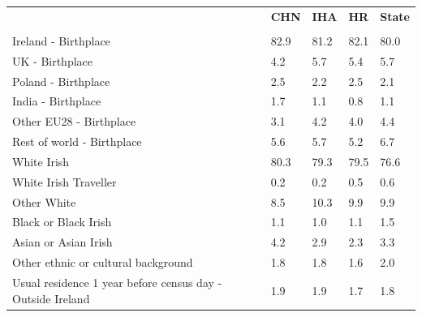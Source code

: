 \documentclass{article}
\begin{document}
\pagebreak
\begin{table}[h]	
\centering
		\begin{tabular}{KTTTT}
  \hline
& \textbf{CHN} & \textbf{IHA} & \textbf{HR}& \textbf{State}\\ 
  \hline
    \\ 
    \hline
Ireland - Birthplace & 82.9& 81.2& 82.1& 80.0\\
UK - Birthplace & 4.2& 5.7& 5.4& 5.7\\
Poland - Birthplace & 2.5& 2.2& 2.5& 2.1\\
India - Birthplace & 1.7& 1.1& 0.8& 1.1\\
Other EU28 - Birthplace & 3.1& 4.2& 4.0& 4.4\\
Rest of world - Birthplace & 5.6& 5.7& 5.2& 6.7\\
    \hline
White Irish & 80.3& 79.3& 79.5& 76.6\\
White Irish Traveller & 0.2& 0.2& 0.5& 0.6\\
Other White &  8.5& 10.3&  9.9&  9.9\\
Black or Black Irish & 1.1& 1.0& 1.1& 1.5\\
Asian or Asian Irish & 4.2& 2.9& 2.3& 3.3\\
Other ethnic or cultural background & 1.8& 1.8& 1.6& 2.0\\
    \hline
Usual residence 1 year before census day - Outside Ireland & 1.9& 1.9& 1.7& 1.8\\


\end{tabular}
\end{table}
\end{document}

